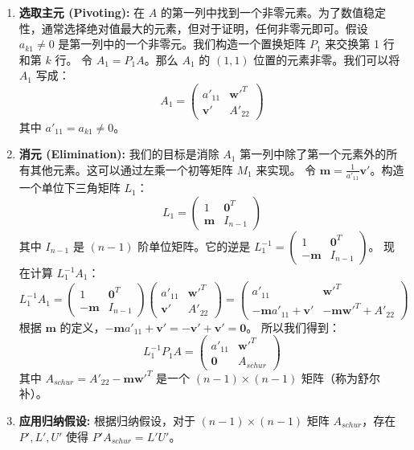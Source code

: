 \documentclass{amsart}
\theoremstyle{plain}
\theoremstyle{definition}
\theoremstyle{remark}
\begin{document}
\begin{enumerate}
	\item \textbf{选取主元 (Pivoting):} 在 $A$ 的第一列中找到一个非零元素。为了数值稳定性，通常选择绝对值最大的元素，但对于证明，任何非零元即可。假设 $a_{k1} \neq 0$ 是第一列中的一个非零元。我们构造一个置换矩阵 $P_1$ 来交换第 1 行和第 $k$ 行。
令 $A_1 = P_1 A$。那么 $A_1$ 的 $(1,1)$ 位置的元素非零。我们可以将 $A_1$ 写成：
\[
A_1 = \begin{pmatrix} a'_{11} & \mathbf{w'}^T \\ \mathbf{v'} & A'_{22} \end{pmatrix}
\]
其中 $a'_{11} = a_{k1} \neq 0$。
	\item \textbf{消元 (Elimination):} 我们的目标是消除 $A_1$ 第一列中除了第一个元素外的所有其他元素。这可以通过左乘一个初等矩阵 $M_1$ 来实现。
令 $\mathbf{m} = \frac{1}{a'_{11}} \mathbf{v'}$。构造一个单位下三角矩阵 $L_1$：
\[
L_1 = \begin{pmatrix} 1 & \mathbf{0}^T \\ \mathbf{m} & I_{n-1} \end{pmatrix}
\]
其中 $I_{n-1}$ 是 $(n-1)$ 阶单位矩阵。它的逆是 $L_1^{-1} = \begin{pmatrix} 1 & \mathbf{0}^T \\ -\mathbf{m} & I_{n-1} \end{pmatrix}$。
现在计算 $L_1^{-1} A_1$：
\[
L_1^{-1} A_1 = \begin{pmatrix} 1 & \mathbf{0}^T \\ -\mathbf{m} & I_{n-1} \end{pmatrix} \begin{pmatrix} a'_{11} & \mathbf{w'}^T \\ \mathbf{v'} & A'_{22} \end{pmatrix} = \begin{pmatrix} a'_{11} & \mathbf{w'}^T \\ -\mathbf{m}a'_{11} + \mathbf{v'} & -\mathbf{m}\mathbf{w'}^T + A'_{22} \end{pmatrix}
\]
根据 $\mathbf{m}$ 的定义，$-\mathbf{m}a'_{11} + \mathbf{v'} = -\mathbf{v'} + \mathbf{v'} = \mathbf{0}$。
所以我们得到：
\[
L_1^{-1} P_1 A = \begin{pmatrix} a'_{11} & \mathbf{w'}^T \\ \mathbf{0} & A_{schur} \end{pmatrix}
\]
其中 $A_{schur} = A'_{22} - \mathbf{m}\mathbf{w'}^T$ 是一个 $(n-1) \times (n-1)$ 矩阵（称为舒尔补）。
	\item \textbf{应用归纳假设:}
根据归纳假设，对于 $(n-1) \times (n-1)$ 矩阵 $A_{schur}$，存在 $P', L', U'$ 使得 $P'A_{schur} = L'U'$。

\end{enumerate}
\end{document}

